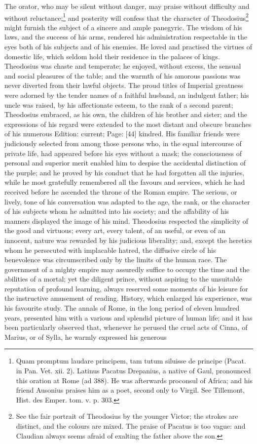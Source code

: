 The orator, who may be silent without danger, may praise without difficulty and without reluctance;\footnote{Quam promptum laudare principem, tam tutum siluisse de principe (Pacat. in Pan. Vet. xii. 2). Latinus Pacatus Drepanius, a native of Gaul, pronounced this oration at Rome (ad 388). He was afterwards proconsul of Africa; and his friend Ausonius praises him as a poet, second only to Virgil. See Tillemont, Hist. des Emper. tom. v. p. 303.} and posterity will confess that the character of Theodosius\footnote{See the fair portrait of Theodosius by the younger Victor; the strokes are distinct, and the colours are mixed. The praise of Pacatus is too vague: and Claudian always seems afraid of exalting the father above the son.} might furnish the subject of a sincere and ample panegyric. The wisdom of his laws, and the success of his arms, rendered his administration respectable in the eyes both of his subjects and of his enemies. He loved and practised the virtues of domestic life, which seldom hold their residence in the palaces of kings. Theodosius was chaste and temperate; he enjoyed, without excess, the sensual and social pleasures of the table; and the warmth of his amorous passions was never diverted from their lawful objects. The proud titles of Imperial greatness were adorned by the tender names of a faithful husband, an indulgent father; his uncle was raised, by his affectionate esteem, to the rank of a second parent; Theodosius embraced, as his own, the children of his brother and sister; and the expressions of his regard were extended to the most distant and obscure branches of his numerous Edition: current; Page: [44] kindred. His familiar friends were judiciously selected from among those persons who, in the equal intercourse of private life, had appeared before his eyes without a mask; the consciousness of personal and superior merit enabled him to despise the accidental distinction of the purple; and he proved by his conduct that he had forgotten all the injuries, while he most gratefully remembered all the favours and services, which he had received before he ascended the throne of the Roman empire. The serious, or lively, tone of his conversation was adapted to the age, the rank, or the character of his subjects whom he admitted into his society; and the affability of his manners displayed the image of his mind. Theodosius respected the simplicity of the good and virtuous; every art, every talent, of an useful, or even of an innocent, nature was rewarded by his judicious liberality; and, except the heretics whom he persecuted with implacable hatred, the diffusive circle of his benevolence was circumscribed only by the limits of the human race. The government of a mighty empire may assuredly suffice to occupy the time and the abilities of a mortal; yet the diligent prince, without aspiring to the unsuitable reputation of profound learning, always reserved some moments of his leisure for the instructive amusement of reading. History, which enlarged his experience, was his favourite study. The annals of Rome, in the long period of eleven hundred years, presented him with a various and splendid picture of human life; and it has been particularly observed that, whenever he perused the cruel acts of Cinna, of Marius, or of Sylla, he warmly expressed his generous 